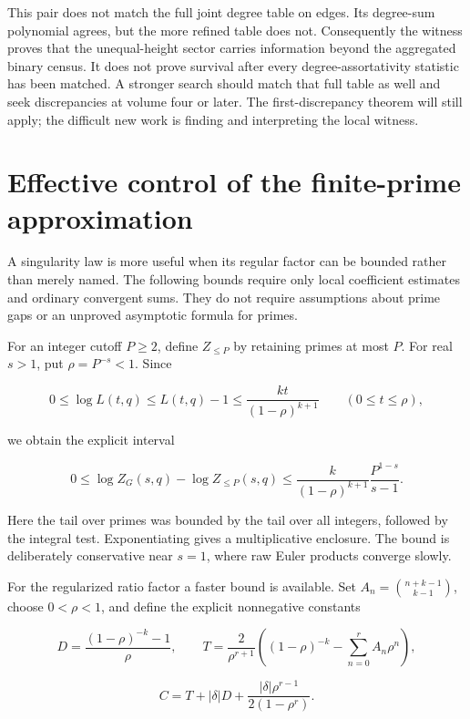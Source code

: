 \documentclass[
  11pt,
  a4paper,
]{report}
\begin{document}
This pair does not match the full joint degree table on edges. Its
degree-sum polynomial agrees, but the more refined table does not.
Consequently the witness proves that the unequal-height sector carries
information beyond the aggregated binary census. It does not prove
survival after every degree-assortativity statistic has been matched. A
stronger search should match that full table as well and seek
discrepancies at volume four or later. The first-discrepancy theorem
will still apply; the difficult new work is finding and interpreting the
local witness.

\hypertarget{effective-control-of-the-finite-prime-approximation}{%
\section{Effective control of the finite-prime
approximation}\label{effective-control-of-the-finite-prime-approximation}}

A singularity law is more useful when its regular factor can be bounded
rather than merely named. The following bounds require only local
coefficient estimates and ordinary convergent sums. They do not require
assumptions about prime gaps or an unproved asymptotic formula for
primes.

For an integer cutoff \(P\ge2\), define \(Z_{\le P}\) by retaining
primes at most \(P\). For real \(s>1\), put \(\rho=P^{-s}<1\). Since

\[
 0\le\log L(t,q)\le L(t,q)-1
 \le\frac{kt}{(1-\rho)^{k+1}}
 \qquad(0\le t\le\rho),
\]

we obtain the explicit interval

\[
 0\le\log Z_G(s,q)-\log Z_{\le P}(s,q)
 \le\frac{k}{(1-\rho)^{k+1}}
 \frac{P^{1-s}}{s-1}.
 \tag{7.11}
\]

Here the tail over primes was bounded by the tail over all integers,
followed by the integral test. Exponentiating gives a multiplicative
enclosure. The bound is deliberately conservative near \(s=1\), where
raw Euler products converge slowly.

For the regularized ratio factor a faster bound is available. Set
\(A_n=\binom{n+k-1}{k-1}\), choose \(0<\rho<1\), and define the explicit
nonnegative constants

\[
 D=\frac{(1-\rho)^{-k}-1}{\rho},\qquad
 T=\frac{2}{\rho^{r+1}}
 \left((1-\rho)^{-k}-\sum_{n=0}^{r}A_n\rho^n\right),
\]

\[
 C=T+|\delta|D+
 \frac{|\delta|\rho^{r-1}}{2(1-\rho^r)}.
 \tag{7.12}
\]
\end{document}
